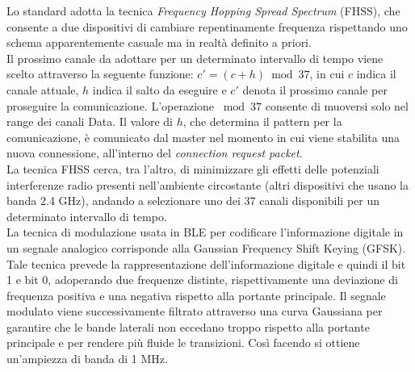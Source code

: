 \noindent Lo standard adotta la tecnica \textit{Frequency Hopping Spread Spectrum} (FHSS), che consente a due dispositivi di cambiare repentinamente frequenza rispettando uno schema apparentemente casuale ma in realtà definito a priori. \\
Il prossimo canale da adottare per un determinato intervallo di tempo viene scelto attraverso la seguente funzione: $ c'=(c+h) \bmod{37}$, in cui $c$ indica il canale attuale, $h$ indica il salto da eseguire e $c'$ denota il prossimo canale per proseguire la comunicazione. L'operazione $\bmod{37}$ consente di muoversi solo nel range dei canali Data. Il valore di $h$, che determina il pattern per la comunicazione, è comunicato dal master nel momento in cui viene stabilita una nuova connessione, all'interno del \textit{connection request packet}.\\
La tecnica FHSS cerca, tra l'altro, di minimizzare gli effetti delle potenziali interferenze radio presenti nell'ambiente circostante (altri dispositivi che usano la banda 2.4 GHz), andando a selezionare uno dei 37 canali disponibili per un determinato intervallo di tempo.\\

\noindent La tecnica di modulazione usata in BLE per codificare l'informazione digitale in un segnale analogico corrisponde alla Gaussian Frequency Shift Keying (GFSK).
Tale tecnica prevede la rappresentazione dell'informazione digitale e quindi il bit 1 e bit 0, adoperando due frequenze distinte, rispettivamente una deviazione di frequenza positiva e una negativa rispetto alla portante principale. Il segnale modulato viene successivamente filtrato attraverso una curva Gaussiana per garantire che le bande laterali non eccedano troppo rispetto alla portante principale e per rendere più fluide le transizioni. Così facendo si ottiene un'ampiezza di banda di 1 MHz.\\

